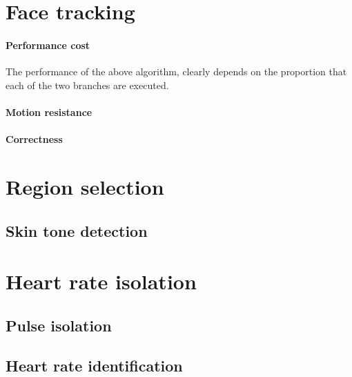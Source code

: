 \section{Face tracking}
\label{section:face_tracking}
\paragraph{Performance cost}
The performance of the above algorithm, clearly depends on the proportion that each of the two branches are executed.
\paragraph{Motion resistance}

\paragraph{Correctness}

\section{Region selection}
\label{section:region_selection}

\subsection{Skin tone detection}
\label{section:skin_tone_detection}

\section{Heart rate isolation}
\subsection{Pulse isolation}
\label{section:bss}
\label{section:ica_assumption}
\subsection{Heart rate identification}
